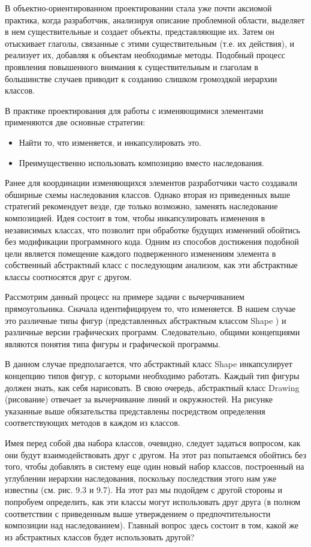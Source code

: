 \documentclass[10pt]{article}
\begin{document}
В объектно-ориентированном проектировании стала уже почти аксиомой практика,
когда разработчик, анализируя описание проблемной области, выделяет в нем существительные
и создает объекты, представляющие их. Затем он отыскивает глаголы,
связанные с этими существительным (т.е. их действия), и реализует их, добавляя к
объектам необходимые методы. Подобный процесс проявления повышенного внимания
к существительным и глаголам в большинстве случаев приводит к созданию
слишком громоздкой иерархии классов.

В практике проектирования для работы с изменяющимися элементами применяются две основные стратегии:
\begin{itemize}
	\item Найти то, что изменяется, и инкапсулировать это.
	\item Преимущественно использовать композицию вместо наследования.
\end{itemize}
Ранее для координации изменяющихся элементов разработчики часто создавали
обширные схемы наследования классов. Однако вторая из приведенных выше
стратегий рекомендует везде, где только возможно, заменять наследование композицией.
Идея состоит в том, чтобы инкапсулировать изменения в независимых классах,
что позволит при обработке будущих изменений обойтись без модификации
программного кода. Одним из способов достижения подобной цели является помещение каждого
подверженного изменениям элемента в собственный абстрактный класс с
последующим анализом, как эти абстрактные классы соотносятся друг с другом.

Рассмотрим данный процесс на примере задачи с вычерчиванием прямоугольника.
Сначала идентифицируем то, что изменяется. В нашем случае это различные типы
фигур (представленных абстрактным классом Shape ) и различные версии
графических программ. Следовательно, общими концепциями являются понятия типа фигуры
и графической программы.


В данном случае предполагается, что абстрактный класс Shape инкапсулирует
концепцию типов фигур, с которыми необходимо работать. Каждый тип фигуры
должен знать, как себя нарисовать. В свою очередь, абстрактный класс Drawing
(рисование) отвечает за вычерчивание линий и окружностей. На рисунке указанные
выше обязательства представлены посредством определения соответствующих
методов в каждом из классов.


Имея перед собой два набора классов, очевидно, следует задаться вопросом, как
они будут взаимодействовать друг с другом. На этот раз попытаемся обойтись без
того, чтобы добавлять в систему еще один новый набор классов, построенный на
углублении иерархии наследования, поскольку последствия этого нам уже известны
(см. рис. 9.3 и 9.7). На этот раз мы подойдем с другой стороны и попробуем
определить, как эти классы могут использовать друг друга (в полном соответствии с
приведенным выше утверждением о предпочтительности композиции над наследованием).
Главный вопрос здесь состоит в том, какой же из абстрактных классов будет
использовать другой?
\end{document}
